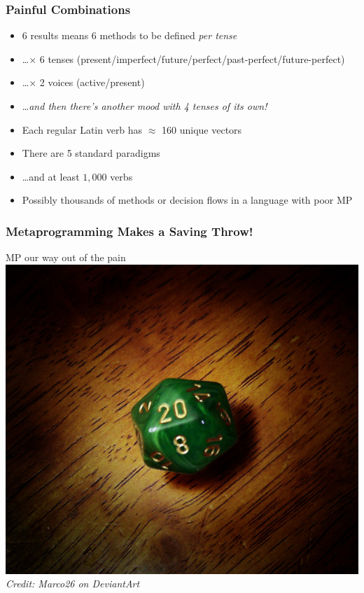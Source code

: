 \documentclass[slidestop,compress,mathserif]{beamer}
\begin{document}
\begin{frame}
	\frametitle{Painful Combinations}
	\begin{itemize}
		\item 6 results means 6 methods to be defined \emph{per tense}
		\pause
		\item \ldots $\times$ 6 tenses (present/imperfect/future/perfect/past-perfect/future-perfect)
		\pause
		\item \ldots $\times$ 2 voices (active/present)
		\pause
		\item \ldots \emph{and then there's another mood with 4 tenses of its own!}
		\pause
		\item Each regular Latin verb has $\approx$  160 unique vectors
		\pause
		\item There are 5 standard paradigms
		\pause
		\item \ldots and at least $1,000$ verbs
		\pause
		\item Possibly thousands of methods or decision flows in a language with poor MP
	\end{itemize}
\end{frame}

\begin{frame}
	\frametitle{Metaprogramming Makes a Saving Throw!}
	\begin{center}
		MP our way out of the pain
		\vskip 1.0cm
		\includegraphics[scale=0.25]{img/natural_20.jpg} \\
		\tiny
		\emph{Credit: Marco26 on DeviantArt}
		\normalsize
	\end{center}
\end{frame}
\end{document}
